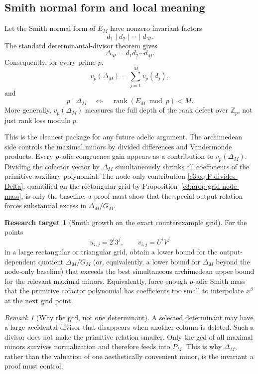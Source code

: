 \documentclass[11pt,oneside]{article}
\theoremstyle{definition}
\newtheorem{target}[theorem]{Research target}
\theoremstyle{remark}
\newtheorem{remark}[theorem]{Remark}
\newcommand{\Z}{\mathbb Z}
\newcommand{\rank}{\operatorname{rank}}
\begin{document}
\subsection{Smith normal form and local meaning}

Let the Smith normal form of $E_M$ have nonzero invariant factors
\[
 d_1\mid d_2\mid\cdots\mid d_M.
\]
The standard determinantal-divisor theorem gives
\begin{equation}
 \Delta_M=d_1d_2\cdots d_M.
 \label{c3:eq-smith-product}
\end{equation}
Consequently, for every prime $p$,
\begin{equation}
 v_p(\Delta_M)=\sum_{j=1}^{M}v_p(d_j),
 \label{c3:eq-smith-vp}
\end{equation}
and
\begin{equation}
 p\mid\Delta_M
 \quad\Longleftrightarrow\quad
 \rank(E_M\bmod p)<M.
 \label{c3:eq-rankdrop}
\end{equation}
More generally, $v_p(\Delta_M)$ measures the full depth of the rank defect over
$\Z_p$, not just rank loss modulo $p$.

This is the cleanest package for any future adelic argument.  The archimedean side controls
the maximal minors by divided differences and Vandermonde products.  Every $p$-adic
congruence gain appears as a contribution to $v_p(\Delta_M)$.  Dividing the cofactor vector by
$\Delta_M$ simultaneously shrinks all coefficients of the primitive auxiliary polynomial.
The node-only contribution \eqref{c3:eq-F-divides-Delta}, quantified on the rectangular
grid by Proposition~\ref{c3:prop-grid-node-mass}, is only the baseline; a proof must show
that the special output relation forces substantial excess in $\Delta_M/G_M$.

\begin{target}[Smith growth on the exact counterexample grid]
\label{c3:target-smith-growth}
For the points
\[
 u_{i,j}=2^i3^j,
 \qquad
 v_{i,j}=U^iV^j
\]
in a large rectangular or triangular grid, obtain a lower bound for the output-dependent quotient $\Delta_M/G_M$ (or, equivalently,
a lower bound for $\Delta_M$ beyond the node-only baseline) that exceeds the best simultaneous archimedean upper bound for the relevant
maximal minors.  Equivalently, force enough $p$-adic Smith mass that the primitive cofactor
polynomial has coefficients too small to interpolate $x^\beta$ at the next grid point.
\end{target}

\begin{remark}[Why the gcd, not one determinant]
A selected determinant may have a large accidental divisor that disappears when another
column is deleted.  Such a divisor does not make the primitive relation smaller.  Only the
gcd of all maximal minors survives normalization and therefore feeds into
$P_M$.  This is why $\Delta_M$, rather than the valuation of one aesthetically convenient
minor, is the invariant a proof must control.
\end{remark}
\end{document}
